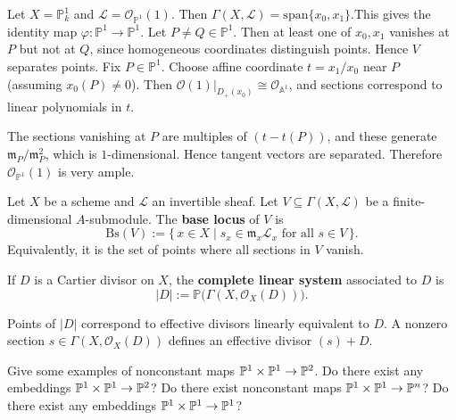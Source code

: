 \documentclass[12pt]{article}
\begin{document}
\begin{example}
    Let $X = \mathbb P^1_k$ and $\mathcal L = \mathcal O_{\mathbb P^1}(1)$. Then $\Gamma(X,\mathcal L) = \mathrm{span}\{x_0,x_1\}$.This gives the identity map $\varphi : \mathbb P^1 \to \mathbb P^1$.
    Let $P \neq Q \in \mathbb P^1$. Then at least one of $x_0,x_1$ vanishes at $P$ but not at $Q$, since homogeneous coordinates distinguish points. Hence $V$ separates points. Fix $P \in \mathbb P^1$. Choose affine coordinate $t = x_1/x_0$ near $P$ (assuming $x_0(P)\neq 0$). Then $\mathcal O(1)|_{D_+(x_0)} \cong \mathcal O_{\mathbb A^1}$, and sections correspond to linear polynomials in $t$.

    The sections vanishing at $P$ are multiples of $(t - t(P))$, and these generate $\mathfrak m_P / \mathfrak m_P^2$, which is $1$-dimensional. Hence tangent vectors are separated. Therefore $\mathcal O_{\mathbb P^1}(1)$ is very ample.
\end{example}

\begin{definition}
    Let $X$ be a scheme and $\mathcal L$ an invertible sheaf. Let $V \subseteq \Gamma(X,\mathcal L)$ be a finite-dimensional $A$-submodule. The \textbf{base locus} of $V$ is
    \[
        \mathrm{Bs}(V) := \{\, x \in X \mid s_x \in \mathfrak m_x \mathcal L_x \text{ for all } s \in V \,\}.
    \]
    Equivalently, it is the set of points where all sections in $V$ vanish.
\end{definition}

\begin{definition}
    If $D$ is a Cartier divisor on $X$, the \textbf{complete linear system} associated to $D$ is
    \[
        |D| := \mathbb P\big(\Gamma(X,\mathcal O_X(D))\big).
    \]
\end{definition}

Points of $|D|$ correspond to effective divisors linearly equivalent to $D$. A nonzero section $s \in \Gamma(X,\mathcal O_X(D))$ defines an effective divisor $(s)+D$.

\begin{exercise}
    Give some examples of nonconstant maps $\P^1\times \P^1 \to \P^2$. Do there exist any embeddings $\P^1\times \P^1 \to \P^2$? Do there exist nonconstant maps $\P^1\times \P^1 \to \P^n$? Do there exist any embeddings $\P^1\times \P^1 \to \P^1$?
\end{exercise}
\end{document}
